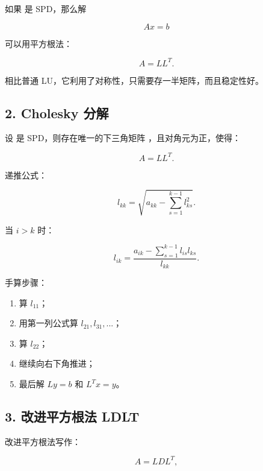 \documentclass[11pt,a4paper]{ctexart}
\newcommand{\code}[1]{\begingroup\ttfamily\small #1\endgroup}
\begin{document}

如果 \code{} 是 SPD，那么解

\[
Ax=b
\]

可以用平方根法：

\[
A=LL^T.
\]

相比普通 LU，它利用了对称性，只需要存一半矩阵，而且稳定性好。


\subsection*{2. Cholesky 分解}


设 \code{} 是 SPD，则存在唯一的下三角矩阵 \code{}，且对角元为正，使得：

\[
A=LL^T.
\]

递推公式：

\[
l_{kk}=\sqrt{a_{kk}-\sum_{s=1}^{k-1}l_{ks}^2}.
\]

当 $i>k$ 时：

\[
l_{ik}=\frac{a_{ik}-\sum_{s=1}^{k-1}l_{is}l_{ks}}{l_{kk}}.
\]

手算步骤：

\begin{enumerate}

\item 算 $l_{11}$；

\item 用第一列公式算 $l_{21},l_{31},...$；

\item 算 $l_{22}$；

\item 继续向右下角推进；

\item 最后解 $Ly=b$ 和 $L^Tx=y$。

\end{enumerate}


\subsection*{3. 改进平方根法 LDLT}


改进平方根法写作：

\[
A=LDL^T,
\]
\end{document}
